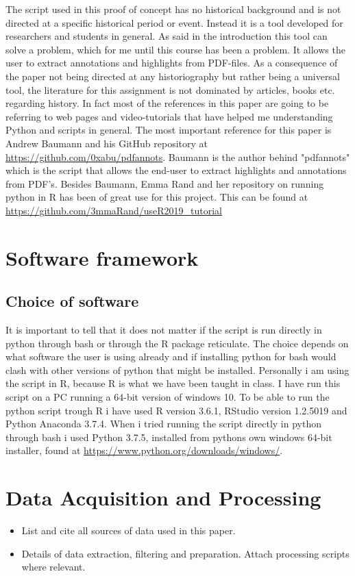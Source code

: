 \documentclass{article}
\begin{document}
The script used in this proof of concept has no historical background and is not directed at a specific historical period or event. Instead it is a tool developed for researchers and students in general. As said in the introduction this tool can solve a problem, which for me until this course has been a problem. It allows the user to extract annotations and highlights from PDF-files.
As a consequence of the paper not being directed at any historiography but rather being a universal tool, the literature for this assignment is not dominated by articles, books etc. regarding history. In fact most of the references in this paper are going to be referring to web pages and video-tutorials that have helped me understanding Python and scripts in general.
The most important reference for this paper is Andrew Baumann and his GitHub repository at \url{https://github.com/0xabu/pdfannots}. Baumann is the author behind "pdfannots" which is the script that allows the end-user to extract highlights and annotations from PDF's. Besides Baumann, Emma Rand and her repository on running python in R has been of great use for this project. This can be found at \url{https://github.com/3mmaRand/useR2019_tutorial}

\section{Software framework}
\subsection{Choice of software}
It is important to tell that it does not matter if the script is run directly in python through bash or through the R package reticulate. The choice depends on what software the user is using already and if installing python for bash would clash with other versions of python that might be installed. Personally i am using the script in R, because R is what we have been taught in class.
I have run this script on a PC running a 64-bit version of windows 10. To be able to run the python script trough R i have used R version 3.6.1, RStudio version 1.2.5019 and Python Anaconda 3.7.4.\newline
When i tried running the script directly in python through bash i used Python 3.7.5, installed from pythons own windows 64-bit installer, found at \url{https://www.python.org/downloads/windows/}. \newline

\section{Data Acquisition and Processing}
\begin{itemize}
\item List and cite all sources of data used in this paper.
\item Details of data extraction, filtering and preparation. Attach processing scripts where relevant.
\end{itemize}{}
\end{document}
